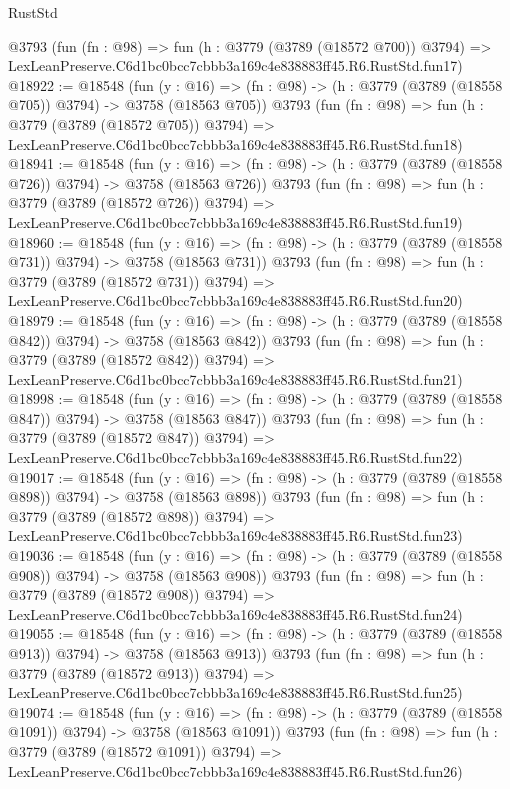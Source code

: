 \begin{lexlean}{RustStd}
\begin{coremodule}
    @3793
    (fun (fn : @98) =>
    fun (h : @3779 (@3789 (@18572 @700)) @3794) =>
    LexLeanPreserve.C6d1bc0bcc7cbbb3a169c4e838883ff45.R6.RustStd.fun17)
@18922 := @18548
    (fun (y : @16) => (fn : @98) -> (h : @3779 (@3789 (@18558 @705)) @3794) -> @3758 (@18563 @705))
    @3793
    (fun (fn : @98) =>
    fun (h : @3779 (@3789 (@18572 @705)) @3794) =>
    LexLeanPreserve.C6d1bc0bcc7cbbb3a169c4e838883ff45.R6.RustStd.fun18)
@18941 := @18548
    (fun (y : @16) => (fn : @98) -> (h : @3779 (@3789 (@18558 @726)) @3794) -> @3758 (@18563 @726))
    @3793
    (fun (fn : @98) =>
    fun (h : @3779 (@3789 (@18572 @726)) @3794) =>
    LexLeanPreserve.C6d1bc0bcc7cbbb3a169c4e838883ff45.R6.RustStd.fun19)
@18960 := @18548
    (fun (y : @16) => (fn : @98) -> (h : @3779 (@3789 (@18558 @731)) @3794) -> @3758 (@18563 @731))
    @3793
    (fun (fn : @98) =>
    fun (h : @3779 (@3789 (@18572 @731)) @3794) =>
    LexLeanPreserve.C6d1bc0bcc7cbbb3a169c4e838883ff45.R6.RustStd.fun20)
@18979 := @18548
    (fun (y : @16) => (fn : @98) -> (h : @3779 (@3789 (@18558 @842)) @3794) -> @3758 (@18563 @842))
    @3793
    (fun (fn : @98) =>
    fun (h : @3779 (@3789 (@18572 @842)) @3794) =>
    LexLeanPreserve.C6d1bc0bcc7cbbb3a169c4e838883ff45.R6.RustStd.fun21)
@18998 := @18548
    (fun (y : @16) => (fn : @98) -> (h : @3779 (@3789 (@18558 @847)) @3794) -> @3758 (@18563 @847))
    @3793
    (fun (fn : @98) =>
    fun (h : @3779 (@3789 (@18572 @847)) @3794) =>
    LexLeanPreserve.C6d1bc0bcc7cbbb3a169c4e838883ff45.R6.RustStd.fun22)
@19017 := @18548
    (fun (y : @16) => (fn : @98) -> (h : @3779 (@3789 (@18558 @898)) @3794) -> @3758 (@18563 @898))
    @3793
    (fun (fn : @98) =>
    fun (h : @3779 (@3789 (@18572 @898)) @3794) =>
    LexLeanPreserve.C6d1bc0bcc7cbbb3a169c4e838883ff45.R6.RustStd.fun23)
@19036 := @18548
    (fun (y : @16) => (fn : @98) -> (h : @3779 (@3789 (@18558 @908)) @3794) -> @3758 (@18563 @908))
    @3793
    (fun (fn : @98) =>
    fun (h : @3779 (@3789 (@18572 @908)) @3794) =>
    LexLeanPreserve.C6d1bc0bcc7cbbb3a169c4e838883ff45.R6.RustStd.fun24)
@19055 := @18548
    (fun (y : @16) => (fn : @98) -> (h : @3779 (@3789 (@18558 @913)) @3794) -> @3758 (@18563 @913))
    @3793
    (fun (fn : @98) =>
    fun (h : @3779 (@3789 (@18572 @913)) @3794) =>
    LexLeanPreserve.C6d1bc0bcc7cbbb3a169c4e838883ff45.R6.RustStd.fun25)
@19074 := @18548
    (fun (y : @16) =>
    (fn : @98) -> (h : @3779 (@3789 (@18558 @1091)) @3794) -> @3758 (@18563 @1091))
    @3793
    (fun (fn : @98) =>
    fun (h : @3779 (@3789 (@18572 @1091)) @3794) =>
    LexLeanPreserve.C6d1bc0bcc7cbbb3a169c4e838883ff45.R6.RustStd.fun26)

\end{coremodule}
\end{lexlean}
